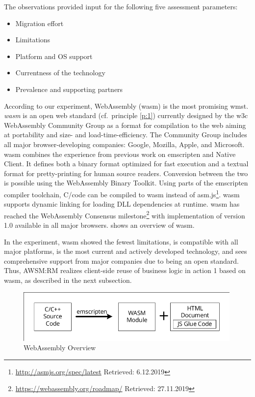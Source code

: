 \pagebreak
The observations provided input for the following five assessment parameters:

\begin{itemize}
\tightlist
\item
  Migration effort
\item
  Limitations
\item
  Platform and OS support
\item
  Currentness of the technology
\item
  Prevalence and supporting partners
\end{itemize}

According to our experiment, WebAssembly (\gls{wasm}) is the most promising \gls{wmst}.
\emph{\gls{wasm}} \autocite{W3C2018WebAssembly} is an open \gls{web} standard (cf.~principle \cref{p:1}) currently designed by the \gls{w3c} WebAssembly Community Group as a format for compilation to the \gls{web} aiming at portability and size- and load-time-efficiency.
The Community Group includes all major browser-developing companies: Google, Mozilla, Apple, and Microsoft.
\gls{wasm} combines the experience from previous work on emscripten and Native Client.
It defines both a binary format optimized for fast execution and a textual format for pretty-printing for human source readers.
Conversion between the two is possible using the WebAssembly Binary Toolkit.
Using parts of the emscripten compiler toolchain, C/\cpp code can be compiled to \gls{wasm} instead of asm.js\footnote{\url{http://asmjs.org/spec/latest} Retrieved: 6.12.2019}.
\gls{wasm} supports dynamic linking for loading DLL dependencies at runtime.
\gls{wasm} has reached the WebAssembly Consensus milestone\footnote{\url{https://webassembly.org/roadmap/} Retrieved: 27.11.2019} with implementation of version 1.0 available in all major browsers.
 shows an overview of \gls{wasm}.

In the experiment, \gls{wasm} showed the fewest limitations, is compatible with all major platforms, is the most current and actively developed technology, and sees comprehensive support from major companies due to being an open standard.
Thus, AWSM:RM realizes client-side reuse of business logic in action 1 based on \gls{wasm}, as described in the next subsection.

\begin{figure}[h!]
\hypertarget{fig:awsm.rm.wasm}{%
\centering
\includegraphics[width=0.99\textwidth]{../figures/rewamp/wasm.pdf}
\caption[WebAssembly Overview]{WebAssembly Overview\footnotemark{}}\label{fig:awsm.rm.wasm}
}
\end{figure}

